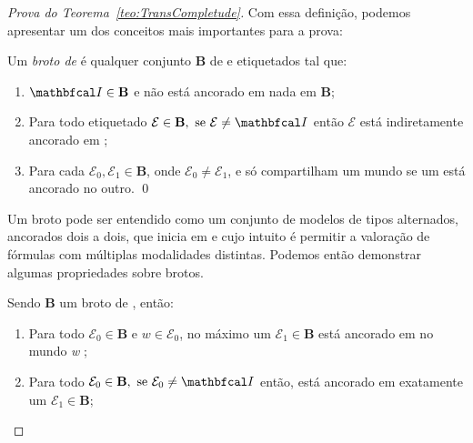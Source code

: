 \begin{apendicesenv}
\begin{proof}[Prova do Teorema~\ref{teo:TransCompletude}]
            Com essa definição, podemos apresentar um dos conceitos mais importantes para a prova:

            \begin{definicao}[Brotos]
                \label{def:Definicao3}
                Um \textit{broto de \Modeloinicial} é qualquer conjunto \textbf{B} de \PImodelos e \OPImodelos etiquetados tal que:
                \begin{enumerate}[label=\textnormal{\ref{def:Definicao3}.\arabic*}]
                    \item \(\modeloinicial \in \mathbf{B}\) e \Modeloinicial não está ancorado em nada em \textbf{B}; \label{caso:Definicao3-1}

                    \item Para todo \PImodelo etiquetado \(\mathcal{E} \in \mathbf{B}, \text{ se } \mathcal{E} \neq \modeloinicial\) então \(\mathcal{E}\)
                        está indiretamente ancorado em \Modeloinicial; \label{caso:Definicao3-2}

                    \item Para cada \(\mathcal{E}_{0}, \mathcal{E}_{1} \in \mathbf{B}\), onde \(\mathcal{E}_{0} \neq \mathcal{E}_{1}\),  e  só compartilham
                        um mundo se um está ancorado no outro. \label{caso:Definicao3-3} \qed
                \end{enumerate}
            \end{definicao}

            Um broto pode ser entendido como um conjunto de modelos de tipos alternados, ancorados dois a dois, que inicia em \Modeloinicial e cujo intuito é
            permitir a valoração de fórmulas com múltiplas modalidades distintas. Podemos então demonstrar algumas propriedades sobre brotos.

            \begin{lema}
                \label{teo:Lema3}
                Sendo \textnormal{\textbf{B}} um broto de \Modeloinicial, então:
                \begin{enumerate}[label=\textnormal{\ref{teo:Lema3}.\arabic*}]
                    \item \textnormal{Para todo \(\mathcal{E}_{0} \in \mathbf{B}\) e \(w \in \mathcal{E}_{0}\), no máximo um \(\mathcal{E}_{1} \in \mathbf{B}\) está
                        ancorado em  no mundo \textit{w} \label{caso:Lema3-1};}

                    \item \textnormal{Para todo \(\mathcal{E}_{0} \in \mathbf{B}, \text{ se } \mathcal{E}_{0} \neq \modeloinicial\) então,  está ancorado em exatamente um
                    \(\mathcal{E}_{1} \in \mathbf{B}\); \label{caso:Lema3-2}}


\end{enumerate}
\end{lema}
\end{proof}
\end{apendicesenv}
